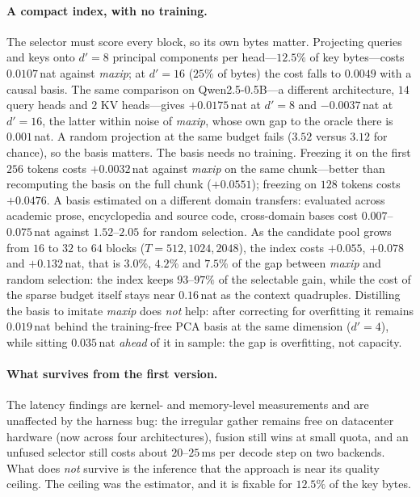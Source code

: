 \documentclass[sigconf,nonacm,11pt]{acmart}
\begin{document}
\paragraph{A compact index, with no training.} The selector must score every block,
so its own bytes matter. Projecting queries and keys onto $d'=8$ principal
components per head---$12.5\%$ of key bytes---costs $0.0107$\,nat against
\emph{maxip}; at $d'=16$ ($25\%$ of
bytes) the cost falls to $0.0049$ with a causal basis. The same comparison on Qwen2.5-0.5B---a
different architecture, $14$ query heads and $2$ KV heads---gives $+0.0175$\,nat
at $d'=8$ and $-0.0037$\,nat at $d'=16$, the latter within noise of \emph{maxip},
whose own gap to the oracle there is $0.001$\,nat. A random projection at the same
budget fails ($3.52$ versus $3.12$ for chance), so the basis matters. The basis
needs no training. Freezing it on the first $256$ tokens costs $+0.0032$\,nat
against \emph{maxip} on the same chunk---better than recomputing the basis on
the full chunk ($+0.0551$); freezing on $128$ tokens costs $+0.0476$. A basis
estimated on a different domain transfers: evaluated across academic prose,
encyclopedia and source code, cross-domain bases cost $0.007$--$0.075$\,nat
against $1.52$--$2.05$ for random selection. As the candidate pool grows from
$16$ to $32$ to $64$ blocks ($T=512,1024,2048$), the index costs $+0.055$,
$+0.078$ and $+0.132$\,nat, that is $3.0\%$, $4.2\%$ and $7.5\%$ of the gap
between \emph{maxip} and random selection: the index keeps $93$--$97\%$ of the
selectable gain, while the cost of the sparse budget itself stays near
$0.16$\,nat as the context quadruples. Distilling the basis to imitate
\emph{maxip} does \emph{not} help: after correcting for overfitting it remains
$0.019$\,nat behind the training-free PCA basis at the same dimension
($d'=4$), while sitting $0.035$\,nat \emph{ahead} of it in sample: the gap is
overfitting, not capacity.

\paragraph{What survives from the first version.} The latency findings are kernel-
and memory-level measurements and are unaffected by the harness bug: the
irregular gather remains free on datacenter hardware (now across four
architectures), fusion still wins at small quota, and an unfused selector still
costs about $20$--$25$\,ms per decode step on two backends. What
does \emph{not} survive is the inference that the approach is near its quality
ceiling. The ceiling was the estimator, and it is fixable for $12.5\%$ of the key
bytes.
\end{document}
